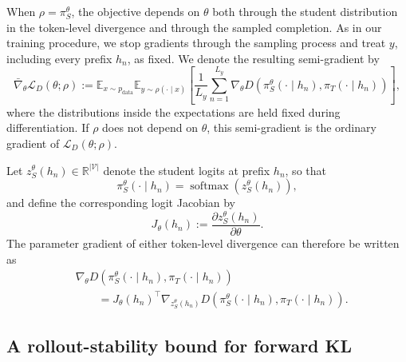 \documentclass{article} %
\theoremstyle{plain}
\theoremstyle{definition}
\theoremstyle{remark}
\begin{document}
When $\rho=\pi_S^\theta$, the objective depends on $\theta$ both through the
student distribution in the token-level divergence and through the sampled
completion.  As in our training procedure, we stop gradients through the
sampling process and treat $y$, including every prefix $h_n$, as fixed.  We
denote the resulting semi-gradient by
\begin{equation}
    \bar\nabla_\theta\mathcal L_D(\theta;\rho)
    :=
    \mathbb E_{x\sim p_{\mathrm{data}}}
    \mathbb E_{y\sim\rho(\cdot\mid x)}
    \left[
        \frac{1}{L_y}
        \sum_{n=1}^{L_y}
        \nabla_\theta
        D\left(
            \pi_S^\theta(\cdot\mid h_n),
            \pi_T(\cdot\mid h_n)
        \right)
    \right],
    \label{eq:rollout-conditioned-semigradient}
\end{equation}
where the distributions inside the expectations are held fixed during
differentiation.  If $\rho$ does not depend on $\theta$, this semi-gradient is
the ordinary gradient of $\mathcal L_D(\theta;\rho)$.

Let $z_S^\theta(h_n)\in\mathbb R^{|\mathcal V|}$ denote the student logits at
prefix $h_n$, so that
\begin{equation}
    \pi_S^\theta(\cdot\mid h_n)
    =
    \operatorname{softmax}\!\left(z_S^\theta(h_n)\right),
\end{equation}
and define the corresponding logit Jacobian by
\begin{equation}
    J_\theta(h_n)
    :=
    \frac{\partial z_S^\theta(h_n)}{\partial\theta}.
    \label{eq:student-logit-jacobian}
\end{equation}
The parameter gradient of either token-level divergence can therefore be
written as
\begin{align}
    &\nabla_\theta
    D\left(
        \pi_S^\theta(\cdot\mid h_n),
        \pi_T(\cdot\mid h_n)
    \right)\nonumber\\
    &\qquad=
    J_\theta(h_n)^\top
    \nabla_{z_S^\theta(h_n)}
    D\left(
        \pi_S^\theta(\cdot\mid h_n),
        \pi_T(\cdot\mid h_n)
    \right).
    \label{eq:token-gradient-chain-rule}
\end{align}

\subsection{A rollout-stability bound for forward KL}
\label{app:forward-rollout-stability}
\end{document}
